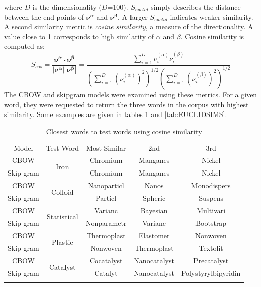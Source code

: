 where $D$ is the dimensionality ($D$=100). $S_{euclid}$ simply describes the distance between the end points of $\mathbf{\nu^\alpha}$ and $\mathbf{\nu^\beta}$. A larger $S_{euclid}$ indicates weaker similarity. A second similarity metric is \emph{cosine similarity}, a measure of the directionality. A value close to 1 corresponds to high similarity of $\alpha$ and $\beta$. Cosine similarity is computed as:
$$S_{cos}=\frac{\mathbf{\nu^\alpha} \cdot \mathbf{\nu^\beta}}{|\mathbf{\nu^\alpha}| |\mathbf{\nu^\beta}|} = \frac{\displaystyle\sum_{i=1}^{D} \nu^{(\alpha)}_{i}\nu^{(\beta)}_{i}}{\left(\displaystyle\sum_{i=1}^{D} (\nu^{(\alpha)}_{i})^2\right)^{1/2} \left(\displaystyle\sum_{i=1}^{D} (\nu^{(\beta)}_{i})^2\right)^{1/2}}
$$
The CBOW and skipgram models were examined using these metrics. For a given word, they were requested to return the three words in the corpus with highest similarity. Some examples are given in tables \ref{tab:COSINESIMS} and \ref{tab:EUCLIDSIMS}.
\begin{table}[H]
\begin{center}
\caption[Word similarity examinations with cosine similarity]{Closest words to test words using cosine similarity}
\label{tab:COSINESIMS}
\begin{tabular}{||c||c|c|c|c||}
\hline
Model     & Test Word              & Most Similar & 2nd & 3rd \\ \hhline{||=||=|=|=|=||}
CBOW      & \multirow{2}{*}{Iron} & Chromium             &  Manganes   &   Nickel  \\ \cline{1-1} \cline{3-5} 
Skip-gram &                   &  Chromium            &   Manganes  &  Nickel   \\ 
\hhline{||=||=|=|=|=||}
CBOW      & \multirow{2}{*}{Colloid} & Nanoparticl             &  Nanos   &   Monodispers  \\ \cline{1-1} \cline{3-5} 
Skip-gram &                   &  Particl            &   Spheric  &  Suspens   \\ 
\hhline{||=||=|=|=|=||}
CBOW      & \multirow{2}{*}{Statistical} & Varianc             &  Bayesian   &   Multivari  \\ \cline{1-1} \cline{3-5} 
Skip-gram &                   &  Nonparametr            &   Varianc  &  Bootstrap   \\ 
\hhline{||=||=|=|=|=||}
CBOW      & \multirow{2}{*}{Plastic} & Thermoplast             &  Elastomer   & Nonwoven    \\ \cline{1-1} \cline{3-5} 
Skip-gram &                   &  Nonwoven            &   Thermoplast  &  Textolit   \\ 
\hhline{||=||=|=|=|=||}
CBOW      & \multirow{2}{*}{Catalyst} & Cocatalyst             &  Nanocatalyst   & Precatalyst    \\ \cline{1-1} \cline{3-5} 
Skip-gram &                   &  Catalyt            &   Nanocatalyst  &  Polystyrylbipyridin   \\ 
\hhline{||=||=|=|=|=||}
\end{tabular}
\end{center}
\end{table}

